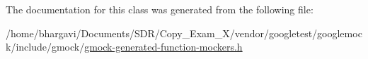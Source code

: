 The documentation for this class was generated from the following file\+:\begin{DoxyCompactItemize}
\item 
/home/bhargavi/\+Documents/\+S\+D\+R/\+Copy\+\_\+\+Exam\+\_\+X/vendor/googletest/googlemock/include/gmock/\hyperlink{gmock-generated-function-mockers_8h}{gmock-\/generated-\/function-\/mockers.\+h}\end{DoxyCompactItemize}
